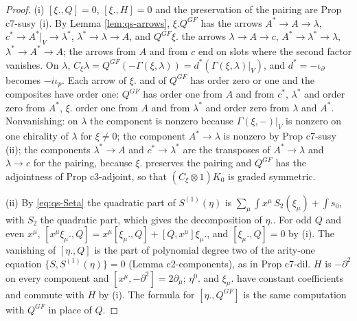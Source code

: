 \documentclass[11pt]{article}
\numberwithin{equation}{section}
\theoremstyle{plain}
\theoremstyle{definition}
\begin{document}
\begin{proof}
(i) $[\xi.,Q]=0$, $[\xi.,H]=0$ and the preservation of the pairing are Prop c7-susy (i). By Lemma \ref{lem:qs-arrows}, $\xi.Q^{GF}$ has the arrows $A^*\to A\to\lambda$, $c^*\to A^*|_V\to\lambda^*$, $\lambda^*\to\lambda\to A$, and $Q^{GF}\xi.$ the arrows $\lambda\to A\to c$, $A^*\to\lambda^*\to\lambda$, $\lambda^*\to A^*\to A$; the arrows from $A$ and from $c$ end on slots where the second factor vanishes. On $\lambda$, $C_\xi\lambda=Q^{GF}(-\Gamma(\xi,\lambda))=d^*(\Gamma(\xi,\lambda)|_V)$, and $d^*=-\iota_\partial$ becomes $-i\iota_p$. Each arrow of $\xi.$ and of $Q^{GF}$ has order zero or one and the composites have order one: $Q^{GF}$ has order one from $A$ and from $c^*$, $\lambda^*$ and order zero from $A^*$, $\xi.$ order one from $A$ and from $\lambda^*$ and order zero from $\lambda$ and $A^*$. Nonvanishing: on $\lambda$ the component is nonzero because $\Gamma(\xi,-)|_V$ is nonzero on one chirality of $\lambda$ for $\xi\ne0$; the component $A^*\to\lambda$ is nonzero by Prop c7-susy (ii); the components $\lambda^*\to A$ and $c^*\to\lambda^*$ are the transposes of $A^*\to\lambda$ and $\lambda\to c$ for the pairing, because $\xi.$ preserves the pairing and $Q^{GF}$ has the adjointness of Prop c3-adjoint, so that $(C_\xi\otimes1)K_0$ is graded symmetric.

(ii) By \eqref{eq:qs-Seta} the quadratic part of $S^{(1)}(\eta)$ is $\sum_\mu\int x^\mu\,S_2(\xi_\mu)+\int s_0$, with $S_2$ the quadratic part, which gives the decomposition of $\eta.$. For odd $Q$ and even $x^\mu$, $[x^\mu\xi_\mu.,Q]=x^\mu[\xi_\mu.,Q]+[Q,x^\mu]\xi_\mu.$, and $[\xi_\mu.,Q]=0$ by (i). The vanishing of $[\eta.,Q]$ is the part of polynomial degree two of the arity-one equation $\{S,S^{(1)}(\eta)\}=0$ (Lemma c2-components), as in Prop c7-dil. $H$ is $-\partial^2$ on every component and $[x^\mu,-\partial^2]=2\partial_\mu$; $\eta^0.$ and $\xi_\mu.$ have constant coefficients and commute with $H$ by (i). The formula for $[\eta.,Q^{GF}]$ is the same computation with $Q^{GF}$ in place of $Q$.


\end{proof}
\end{document}

